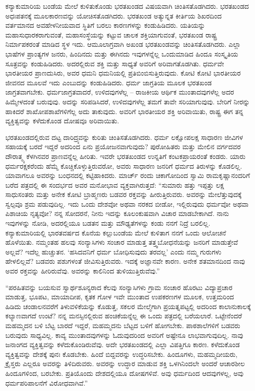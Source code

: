  ಕನ್ಯಾಕುಮಾರಿಯ ಬಂಡೆಯ ಮೇಲೆ ಕುಳಿತುಕೊಂಡು ಭರತಖಂಡದ ವಿಷಯವಾಗಿ ಚಿಂತಿಸತೊಡಗಿದರು. ಭರತಖಂಡದ ಅಧಃಪತನಕ್ಕೆ ಮೂಲಕಾರಣವನ್ನು ಯೋಚಿಸತೊಡಗಿದರು. ಭರತಖಂಡ ಅತ್ಯುನ್ನತ ಕೀರ್ತಿಯ ಶಿಖರದಿಂದ ವರ್ತಮಾನದ ಅವಹೇಳನೀಯವಾದ ಸ್ಥಿತಿಗೆ ಬರಲು ಕಾರಣಗಳನ್ನು ಕಂಡುಹಿಡಿದರು. ಯತಿಯನ್ನು ಮಹಾಸುಧಾರಕರಾಗುವಂತೆ, ಮಹಾಸಂಸ್ಥೆಯನ್ನು ಕಟ್ಟುವ ಚಾಲಕ ಶಕ್ತಿಯಾಗುವಂತೆ, ಭರತಖಂಡ ರಾಷ್ಟ್ರ ನಿರ್ಮಾಪಕರಂತೆ ಮಾಡಿದ ಸ್ಥಳ ಇದು. ಆಮೂಲಾಗ್ರವಾಗಿ ಅಖಂಡ ಭರತಖಂಡವನ್ನು ಚಿಂತಿಸತೊಡಗಿದರು. ಎಲ್ಲಾ ಭಾಷೆಗಳ ಪ್ರಾಂತ್ಯಗಳ ಜನರು, ಹಿಂದಿನದು ಮತ್ತು ಈಗಿನದು ಇವುಗಳನ್ನೆಲ್ಲ ಒಂದುಮಾಡಿದ ಹಿಂದೂ ಸಂಸ್ಕೃತಿಯ ಸೂತ್ರವನ್ನು ಕಂಡುಹಿಡಿದರು. ಅದರಲ್ಲಿರುವ ಶಕ್ತಿ ಮತ್ತು ಸಾಧ್ಯತೆ ಅವರಿಗೆ ಅರಿವಾಗತೊಡಗಿತು. ಧರ್ಮವೇ ಭಾರತೀಯರ ಪ್ರಾಣದುಸಿರು, ಅವರ ಧಮನಿ ಧಮನಿಯಲ್ಲಿ ಪ್ರತಿಬಿಂಬಿಸುತ್ತಿರುವುದು. ಕೋಟಿ ಕೋಟಿ ಭಾರತೀಯರ ಜೀವನದ ಮೂಲವೆ ಇದು ಎಂಬುದನ್ನು ಕಂಡುಹಿಡಿದರು. ಧರ್ಮ ಜಾಗ್ರತಿಯ ಮೂಲಕ ಭರತಖಂಡ ಜಾಗ್ರತವಾಗಬೇಕು. ಧರ್ಮಜಾಗ್ರತವಾದರೆ, ಉಳಿದವುಗಳೆಲ್ಲ – ರಾಜಕೀಯ ಆರ್ಥಿಕ ಮುಂತಾದವುಗಳೆಲ್ಲ ಅದರ ಹಿಮ್ಮೇಳದಂತೆ ಬರುವುವು. ಅದನ್ನು ಸರಿಪಡಿಸಿದರೆ, ಉಳಿದವುಗಳೆಲ್ಲ ತಮಗೆ ತಾವೇ ಸರಿಯಾಗುವುವು. ಬೇರಿಗೆ ನೀರನ್ನು ಹಾಕಿದರೆ ಶಾಖೋಪಶಾಖೆಗಳಿಗೆಲ್ಲ ಅದು ತಾಕುವುದು. ಅವರಿಗೆ ಭಾರತೀಯರ ಶಕ್ತಿ ಅರಿವಾಯಿತು, ರಾಷ್ಟ್ರ ಈಗ ತನ್ನ ವ್ಯಕ್ತಿತ್ವವನ್ನು ಕಳೆದುಕೊಂಡ ದೋಷವೂ ಅರಿವಾಯಿತು. 

 ಭರತಖಂಡದಲ್ಲಿರುವ ದಟ್ಟ ದಾರಿದ್ರ್ಯವನ್ನು ಕುರಿತು ಚಿಂತಿಸತೊಡಗಿದರು. ಧರ್ಮ ಲಕ್ಷೋಪಲಕ್ಷ ಸಾಧಾರಣ ಜೀವಿಗಳ ಸಹಾಯಕ್ಕೆ ಬರದೆ ಇದ್ದರೆ ಅದರಿಂದ ಏನು ಪ್ರಯೋಜನವಾಗುವುದು? ಪುರೋಹಿತರು ಮತ್ತು ಮೇಲಿನ ವರ್ಗದವರ ದೌರಾತ್ಮ್ಯ ಕೆಳಗಿನವರ ಪ್ರಾಣವನ್ನೆಲ್ಲ ಹೀರಿತು. ಇವರೇ ಭರತಖಂಡದ ಉನ್ನತಿಗೆ ಕಂಟಕಪ್ರಾಯರಂತೆ ಕಂಡರು. ಯಾರು ಧರ್ಮರಕ್ಷಕರೆಂದು ಹೆಮ್ಮೆ ಕೊಚ್ಚಿಕೊಳ್ಳುತ್ತಿರುವರೋ, ಅವರು ಸಾಧಾರಣ ಜನರಿಗೆ ಧರ್ಮದ ತಿರುಳನ್ನು ಕೊಡಲಿಲ್ಲ. ಯಾವಾಗಲೂ ಅವರನ್ನು ಬಂಧನದಲ್ಲಿ ಕಟ್ಟಿಹಾಕಿದರು.  ಮಾರ್ಚ್ ರಂದು ಚಿಕಾಗೋದಿಂದ ಸ್ವಾಮಿ ರಾಮಕೃಷ್ಣಾನಂದರಿಗೆ ಬರೆದ ಪತ್ರದಲ್ಲಿ ಈ ಸಂದರ್ಭದ ಅವರ ಮನೋಭಾವ ವ್ಯಕ್ತವಾಗಿರುತ್ತದೆ: “ಸುಮಾರು ಹತ್ತು ಇಪ್ಪತ್ತು ಲಕ್ಷ ಸಾಧುಸಂತರು ಮತ್ತು ಅನೇಕ ಕೋಟಿ ಬ್ರಾಹ್ಮಣರು ಬಡವರ ರಕ್ತವನ್ನು ಹೀರುತ್ತಿರುವರು. ಅವರನ್ನು ಮೇಲೆತ್ತುವುದಕ್ಕೆ ಸ್ವಲ್ಪವೂ ಶ್ರಮ ಪಡುವುದಿಲ್ಲ. ಇದು ಒಂದು ದೇಶವೋ ಅಥವಾ ನರಕದ ಬೀಡೋ, ಇಲ್ಲಿರುವುದು ಧರ್ಮವೋ ಅಥವಾ ಪಿಶಾಚಿಯ ನೃತ್ಯವೋ? ನನ್ನ ಸೋದರನೆ, ನೀನು ಇದನ್ನು ಕೂಲಂಕುಷವಾಗಿ ವಿಚಾರ ಮಾಡಬೇಕಾಗಿದೆ. ನಾನು ಇವುಗಳನ್ನು ನೋಡಿ, ಅದರಲ್ಲಿಯೂ ಬಡತನ ಮತ್ತು ಮೌಢ್ಯತೆಗಳನ್ನು ಕಂಡು ನನಗೆ ನಿದ್ರೆ ಬರಲಿಲ್ಲ. ಕನ್ಯಾಕುಮಾರಿಯಲ್ಲಿ ಭಾರತವರ್ಷದ ಕೊನೆಯ ಕಲ್ಲುಬಂಡೆಯ ಮೇಲೆ ಕುಳಿತಾಗ ನನಗೆ ಒಂದು ಆಲೋಚನೆ ಹೊಳೆಯಿತು. ನಮ್ಮಂತಹ ಹಲವು ಸಂನ್ಯಾಸಿಗಳು ಸಂಚಾರ ಮಾಡುತ್ತ ತತ್ತ್ವಬೋಧನೆಯನ್ನು ಜನರಿಗೆ ಮಾಡುತ್ತೇವೆ ಅಲ್ಲವೆ? ಇದೆಲ್ಲ ಹುಚ್ಚುತನ. ‘ಹಸಿದವನಿಗೆ ಧರ್ಮ ಬೋಧಿಸುವುದು ತರವಲ್ಲ’ ಎಂದು ನಮ್ಮ ಗುರುಗಳು ಹೇಳಲಿಲ್ಲವೆ? ಬಡವರು ಪಶುಗಳಂತೆ ಜೀವಿಸುತ್ತಿರುವರು. ಇದಕ್ಕೆ ಅಜ್ಞಾನವೇ ಕಾರಣ. ಅನೇಕ ಶತಮಾನದಿಂದ ನಾವು ಅವರ ರಕ್ತವನ್ನು ಹೀರಿರುವೆವು. ಅವರನ್ನು ಕಾಲಿನಿಂದ ತುಳಿಯುತ್ತಿರುವೆವು.” 

 “ಪರಹಿತವನ್ನು ಬಯಸುವ ಸ್ವಾರ್ಥಶೂನ್ಯರಾದ ಕೆಲವು ಸಂನ್ಯಾಸಿಗಳು ಗ್ರಾಮ ಸಂಚಾರ ಹೊರಟು ವಿದ್ಯಾಪ್ರಚಾರ ಮಾಡುತ್ತ, ಭೂಪಟ, ಮಾಯಾದೀಪ, ಕೃತಕ ಗೋಳ ಇವೇ ಮುಂತಾದ ಉಪಕರಣಗಳ ಮೂಲಕ, ಉತ್ತಮರಿಂದ ಹಿಡಿದು ಚಂಡಾಲನವರೆಗೆ ತಿಳುವಳಿಕೆಯನ್ನು ಕೊಡುತ್ತ, ಸಕಲರ ಮೇಲ್ಮೆಗಾಗಿ ಪ್ರಯತ್ನಪಟ್ಟಲ್ಲಿ ಅದರಿಂದ ಕಾಲಾನುಕಾಲಕ್ಕೆ ಕಲ್ಯಾಣವಾಗದೆ ಉಂಟೆ? ನನ್ನ ಮನಸ್ಸಿನಲ್ಲಿರುವ ಹಂಚಿಕೆಯನ್ನೆಲ್ಲ ಈ ಒಂದು ಪತ್ರದಲ್ಲಿ ಬರೆಯಲಾರೆ. ಒಟ್ಟೇನೆಂದರೆ ಮಹಮ್ಮದನ ಬಳಿ ಬೆಟ್ಟ ಬಾರದೆ ಇದ್ದರೆ, ಮಹಮ್ಮದನು ಬೆಟ್ಟದ ಬಳಿಗೆ ಹೋಗಬೇಕು. ಪಾಠಶಾಲೆಗಳಿಗೆ ಬಡವರು ಬರುವುದು ಸಾಧ್ಯವಿಲ್ಲ. ಕಾವ್ಯ ಮುಂತಾದವುಗಳನ್ನು ಓದುವುದರಿಂದ ಅವರಿಗೆ ಅಷ್ಟೇನೂ ಲಾಭವಾಗುವುದಿಲ್ಲ. ನಾವು ಜನಾಂಗದ ವ್ಯಕ್ತಿತ್ವವನ್ನು ಕಳೆದುಕೊಂಡಿರುವೆವು. ಅದೇ ಭರತಖಂಡದಲ್ಲಿ ಎಲ್ಲಾ ವಿಪತ್ತಿಗೂ ಕಾರಣ. ಕಳೆದುಕೊಂಡ ವ್ಯಕ್ತಿತ್ವವನ್ನು ದೇಶಕ್ಕೆ ಪುನಃ ಕೊಡಬೇಕು. ಹಿಂದೆ ಬಿದ್ದವರನ್ನು ಉದ್ಧರಿಸಬೇಕು. ಹಿಂದೂಗಳು, ಮಹಮ್ಮದೀಯರು, ಕ್ರೈಸ್ತರು ಎಲ್ಲರೂ ಅವರನ್ನು ತಿಳಿದಿರುವರು. ಅವರನ್ನು ಉದ್ಧಾರ ಮಾಡುವ ಶಕ್ತಿ ಒಳಗಿನಿಂದಲೇ ಅಂದರೆ ಆಚಾರಶೀಲ ಹಿಂದೂಗಳಿಂದ, ಬರಬೇಕು. ಪ್ರತಿಯೊಂದು ದೇಶದಲ್ಲಿಯೂ ದೋಷಗಳಿವೆ. ಅವು ಧರ್ಮದಿಂದ ಆದವುಗಳಲ್ಲ, ಅವು ಧರ್ಮಪರಿಪಾಲನೆಗೆ ವಿರೋಧವಾಗಿವೆ.” 

